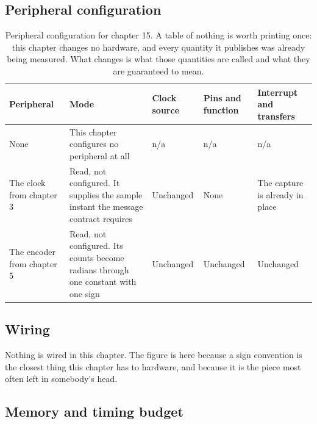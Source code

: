 \subsection*{Peripheral configuration}

\begin{table}[H]\centering\small
\begin{tabular}{p{22mm}p{26mm}p{24mm}p{30mm}p{30mm}}
\toprule
Peripheral & Mode & Clock source & Pins and function & Interrupt and transfers \\
\midrule
None & This chapter configures no peripheral at all & n/a & n/a & n/a \\
The clock from chapter 3 & Read, not configured. It supplies the sample instant
the message contract requires & Unchanged & None & The capture is already in
place \\
The encoder from chapter 5 & Read, not configured. Its counts become radians
through one constant with one sign & Unchanged & Unchanged & Unchanged \\
\bottomrule
\end{tabular}
\caption{Peripheral configuration for chapter 15. A table of nothing is worth printing once: this chapter changes no hardware, and every quantity it publishes was already being measured. What changes is what those quantities are called and what they are guaranteed to mean.}
\end{table}

\subsection*{Wiring}


Nothing is wired in this chapter. The figure is here because a sign convention is
the closest thing this chapter has to hardware, and because it is the piece most
often left in somebody's head.

\subsection*{Memory and timing budget}

